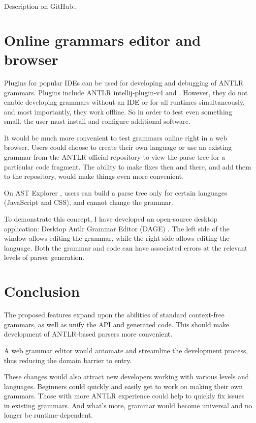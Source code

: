 \documentclass[sigplan,screen]{acmart}
\begin{document}
Description on GitHub:\cite{scannerless-parser}.

\section{Online grammars editor and browser}

Plugins for popular IDEs can be used for developing and debugging of
ANTLR grammars. Plugins include ANTLR intellij-plugin-v4 \cite{ANTLR-intellij-plugin-v4}
and \cite{vscode-antlr4}. However, they do not enable developing grammars without
an IDE or for all runtimes simultaneously, and most importantly, they work offline.
So in order to test even something small, the user must install and
configure additional software.

It would be much more convenient to test grammars online right in a web
browser. Users could choose to create their own language or use an
existing grammar from the ANTLR official repository \cite{grammars-v4} to view
the parse tree for a particular code fragment. The ability to make fixes then and
there, and add them to the repository, would make things even more convenient.

On AST Explorer \cite{astexplorer}, users can build a parse tree only for
certain languages (JavaScript and CSS), and cannot change the grammar.

To demonstrate this concept, I have developed an open-source desktop
application: Desktop Antlr Grammar Editor (DAGE) \cite{dage}. The left side of
the window allows editing the grammar, while the right side allows editing the
language. Both the grammar and code can have associated errors at the relevant
levels of parser generation.

\section{Conclusion}

The proposed features expand upon the abilities of standard context-free
grammars, as well as unify the API and generated code. This should make
development of ANTLR-based parsers more convenient.

A web grammar editor would automate and streamline the development
process, thus reducing the domain barrier to entry.

These changes would also attract new developers working with various
levels and languages. Beginners could quickly and easily get to work on
making their own grammars. Those with more ANTLR experience could help
to quickly fix issues in existing grammars. And what's more, grammar
would become universal and no longer be runtime-dependent.
\end{document}
